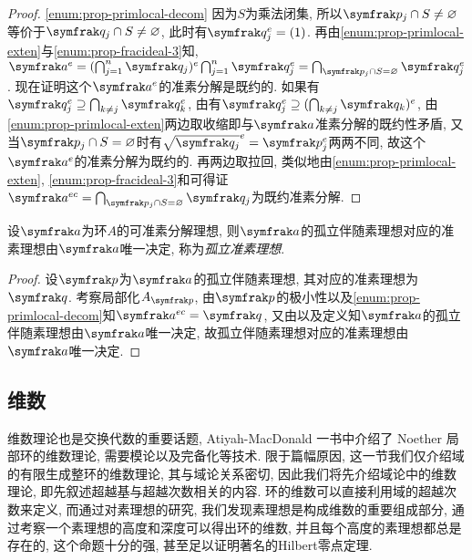 \begin{proof}
  \ref{enum:prop-primlocal-decom} 因为$S$为乘法闭集, 所以$\ideal{p}_j\cap S\neq\varnothing$等价于$\ideal{q}_j\cap S\neq\varnothing$, 此时有$\ideal{q}_j^e=(1)$. 再由\ref{enum:prop-primlocal-exten}与\ref{enum:prop-fracideal-3}知, $\ideal{a}^e=(\bigcap_{j=1}^n\ideal{q}_j)^e\bigcap_{j=1}^n\ideal{q}_j^e=\bigcap_{\ideal{p}_j\cap S=\varnothing}\ideal{q}_j^e$. 现在证明这个$\ideal{a}^e$的准素分解是既约的. 如果有$\ideal{q}_j^e\supseteq\bigcap_{k\neq j}\ideal{q}_k^e$, 由有$\ideal{q}_j^e\supseteq(\bigcap_{k\neq j}\ideal{q}_k)^e$, 由\ref{enum:prop-primlocal-exten}两边取收缩即与$\ideal{a}$准素分解的既约性矛盾, 又当$\ideal{p}_j\cap S=\varnothing$时有$\sqrt{\ideal{q}_j}^e=\ideal{p}_j^e$两两不同, 故这个$\ideal{a}^e$的准素分解为既约的. 再两边取拉回, 类似地由\ref{enum:prop-primlocal-exten}, \ref{enum:prop-fracideal-3}和可得证$\ideal{a}^{ec}=\bigcap_{\ideal{p}_j\cap S=\varnothing}\ideal{q}_j$为既约准素分解.
\end{proof}

\begin{theorem}
  设$\ideal{a}$为环$A$的可准素分解理想, 则$\ideal{a}$的孤立伴随素理想对应的准素理想由$\ideal{a}$唯一决定, 称为\emph{孤立准素理想}.
\end{theorem}

\begin{proof}
  设$\ideal{p}$为$\ideal{a}$的孤立伴随素理想, 其对应的准素理想为$\ideal{q}$. 考察局部化$A_{\ideal{p}}$, 由$\ideal{p}$的极小性以及\ref{enum:prop-primlocal-decom}知$\ideal{a}^{ec}=\ideal{q}$, 又由以及定义知$\ideal{a}$的孤立伴随素理想由$\ideal{a}$唯一决定, 故孤立伴随素理想对应的准素理想由$\ideal{a}$唯一决定.
\end{proof}

\subsection{维数}\label{sec:algebra-dimension}

维数理论也是交换代数的重要话题, Atiyah-MacDonald 一书中介绍了 Noether 局部环的维数理论, 需要模论以及完备化等技术. 限于篇幅原因, 这一节我们仅介绍域的有限生成整环的维数理论, 其与域论关系密切, 因此我们将先介绍域论中的维数理论, 即先叙述超越基与超越次数相关的内容. 环的维数可以直接利用域的超越次数来定义, 而通过对素理想的研究, 我们发现素理想是构成维数的重要组成部分, 通过考察一个素理想的高度和深度可以得出环的维数, 并且每个高度的素理想都总是存在的, 这个命题十分的强, 甚至足以证明著名的Hilbert零点定理.

